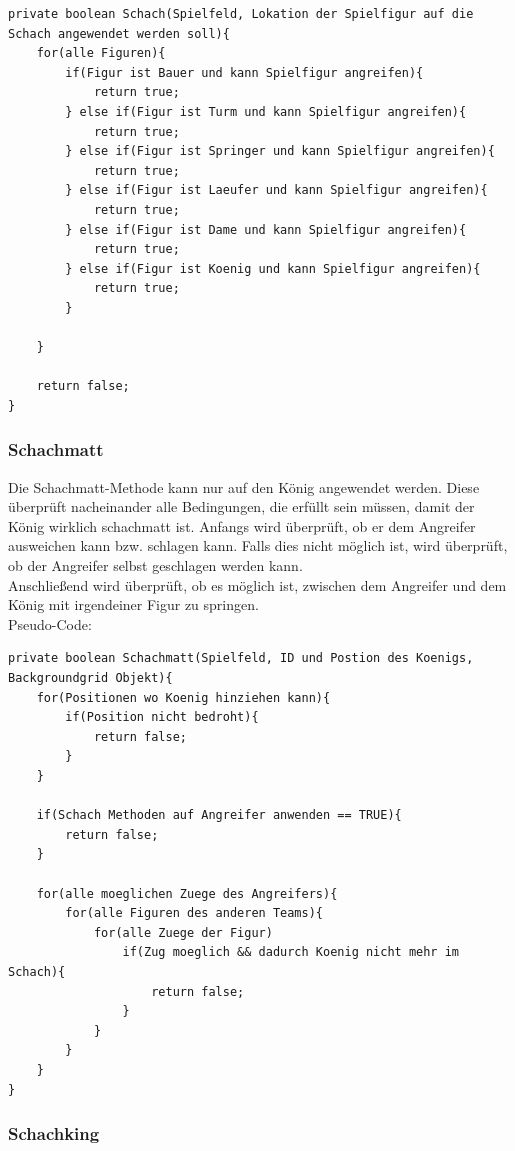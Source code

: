 \documentclass[12pt,a4paper]{article}
\begin{document}
\lstset{language=Java}
\begin{lstlisting}
private boolean Schach(Spielfeld, Lokation der Spielfigur auf die Schach angewendet werden soll){
	for(alle Figuren){
		if(Figur ist Bauer und kann Spielfigur angreifen){
			return true;		
		} else if(Figur ist Turm und kann Spielfigur angreifen){
			return true;
		} else if(Figur ist Springer und kann Spielfigur angreifen){
			return true;
		} else if(Figur ist Laeufer und kann Spielfigur angreifen){
			return true;
		} else if(Figur ist Dame und kann Spielfigur angreifen){
			return true;
		} else if(Figur ist Koenig und kann Spielfigur angreifen){
			return true;
		}
		
	}
	
	return false;	
}
\end{lstlisting}

\subsubsection{Schachmatt}
\label{SUBSUBSEC:checkmate}

Die Schachmatt-Methode kann nur auf den König angewendet werden. Diese überprüft nacheinander alle Bedingungen, die erfüllt sein müssen, damit der König wirklich schachmatt ist. Anfangs wird überprüft, ob er dem Angreifer ausweichen kann bzw. schlagen kann. Falls dies nicht möglich ist, wird überprüft, ob der Angreifer selbst geschlagen werden kann. \\
Anschließend wird überprüft, ob es möglich ist, zwischen dem Angreifer und dem König mit irgendeiner Figur zu springen. \\
Pseudo-Code:

\lstset{language=Java}
\begin{lstlisting}
private boolean Schachmatt(Spielfeld, ID und Postion des Koenigs, Backgroundgrid Objekt){
	for(Positionen wo Koenig hinziehen kann){
		if(Position nicht bedroht){
			return false;
		}
	}
	
	if(Schach Methoden auf Angreifer anwenden == TRUE){
		return false;
	}
	
	for(alle moeglichen Zuege des Angreifers){
		for(alle Figuren des anderen Teams){
			for(alle Zuege der Figur)
				if(Zug moeglich && dadurch Koenig nicht mehr im Schach){
					return false;
				}
			}			
		}
	}
}
\end{lstlisting}


\subsubsection{Schachking}
\label{SUBSUBSEC:checkking}
\end{document}
